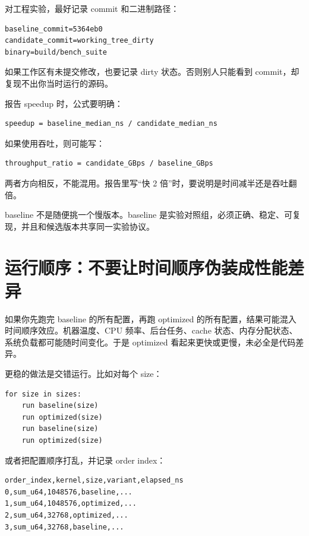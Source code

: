 对工程实验，最好记录 commit 和二进制路径：

\begin{lstlisting}
baseline_commit=5364eb0
candidate_commit=working_tree_dirty
binary=build/bench_suite
\end{lstlisting}

如果工作区有未提交修改，也要记录 dirty 状态。否则别人只能看到 commit，却复现不出你当时运行的源码。

报告 speedup 时，公式要明确：

\begin{lstlisting}
speedup = baseline_median_ns / candidate_median_ns
\end{lstlisting}

如果使用吞吐，则可能写：

\begin{lstlisting}
throughput_ratio = candidate_GBps / baseline_GBps
\end{lstlisting}

两者方向相反，不能混用。报告里写“快 2 倍”时，要说明是时间减半还是吞吐翻倍。

\begin{warningbox}
baseline 不是随便挑一个慢版本。baseline 是实验对照组，必须正确、稳定、可复现，并且和候选版本共享同一实验协议。
\end{warningbox}

\section{运行顺序：不要让时间顺序伪装成性能差异}

如果你先跑完 baseline 的所有配置，再跑 optimized 的所有配置，结果可能混入时间顺序效应。机器温度、CPU 频率、后台任务、cache 状态、内存分配状态、系统负载都可能随时间变化。于是 optimized 看起来更快或更慢，未必全是代码差异。

更稳的做法是交错运行。比如对每个 size：

\begin{lstlisting}
for size in sizes:
    run baseline(size)
    run optimized(size)
    run baseline(size)
    run optimized(size)
\end{lstlisting}

或者把配置顺序打乱，并记录 order index：

\begin{lstlisting}
order_index,kernel,size,variant,elapsed_ns
0,sum_u64,1048576,baseline,...
1,sum_u64,1048576,optimized,...
2,sum_u64,32768,optimized,...
3,sum_u64,32768,baseline,...
\end{lstlisting}

